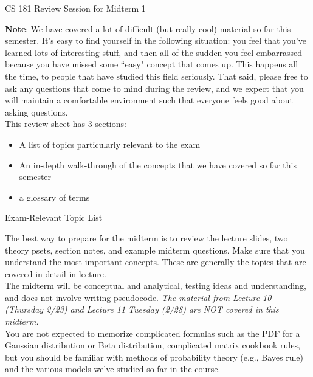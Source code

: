 \documentclass[12pt,letterpaper]{article}
\newcommand{\1}{\mathbbm{1}}
\begin{document}
\begin{center}
\LARGE{CS 181 Review Session for Midterm 1}
\end{center}

\noindent
\textbf{Note}: We have covered a lot of difficult (but really cool) material so far this semester. It's easy to find yourself in the following situation: you feel that you've learned lots of interesting stuff, and then all of the sudden you feel embarrassed because you have missed some ``easy" concept that comes up. This happens all the time, to people that have studied this field seriously. That said, please free to ask any questions that come to mind during the review, and we expect that you will maintain a comfortable environment such that everyone feels good about asking questions.\\

\noindent
This review sheet has 3 sections:
\begin{itemize}
    \item A list of topics particularly relevant to the exam
    
    \item An in-depth walk-through of the concepts that we have covered so far this semester
    
    \item a glossary of terms
\end{itemize}


\begin{center}
\huge{Exam-Relevant Topic List}
\end{center}

\noindent 
The best way to prepare for the midterm is to review the lecture
slides, two theory psets, section notes, and example midterm
questions.  Make sure that you understand the most important concepts.
These are generally the topics that are covered in detail in lecture.\\

\noindent 
The midterm will be conceptual and analytical, testing ideas and
understanding, and does not involve writing pseudocode. {\em The
  material from Lecture 10 (Thursday 2/23) and Lecture 11 Tuesday
  (2/28) are NOT covered in this midterm.}\\
  
\noindent
You are not expected to memorize complicated formulas such as the PDF
for a Gaussian distribution or
Beta distribution, complicated matrix cookbook rules, but you should
be familiar with methods of probability theory (e.g., Bayes rule) and
the various models we've studied so far in the course.\\
\end{document}
